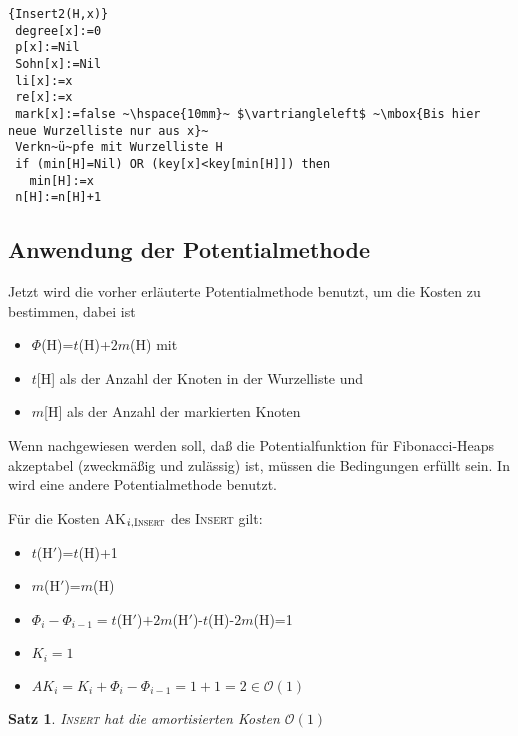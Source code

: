 \documentclass[ngerman,draft,parskip=half*,twoside]{scrreprt}
\theoremstyle{break}
\newtheorem{satz}{Satz}[chapter]
\theoremstyle{nonumberbreak}
\newcommand*{\OO}{\mathcal{O}}      %
\begin{document}
\begin{Algorithmus}[H]
\begin{lstlisting}[frame=tlrb, mathescape=true, title=\textsc{Insert\textnormal{(H, x)}}, gobble=1]{Insert2(H,x)}
 degree[x]:=0
 p[x]:=Nil
 Sohn[x]:=Nil
 li[x]:=x
 re[x]:=x
 mark[x]:=false ~\hspace{10mm}~ $\vartriangleleft$ ~\mbox{Bis hier neue Wurzelliste nur aus x}~
 Verkn~ü~pfe mit Wurzelliste H
 if (min[H]=Nil) OR (key[x]<key[min[H]]) then
   min[H]:=x
 n[H]:=n[H]+1   
\end{lstlisting}
\end{Algorithmus}

\subsection{Anwendung der Potentialmethode}
Jetzt wird die vorher erläuterte Potentialmethode benutzt, um die Kosten zu bestimmen, dabei ist
\begin{itemize}
\item $\Phi$(H)=$t$(H)+$2m$(H) mit
\item $t$[H] als der Anzahl der Knoten in der Wurzelliste und
\item $m$[H] als der Anzahl der markierten Knoten
\end{itemize}
Wenn nachgewiesen werden soll, daß die Potentialfunktion für Fibonacci-Heaps akzeptabel (zweckmäßig und zulässig)
ist, müssen die Bedingungen erfüllt sein. In \cite{ottmann} wird eine andere Potentialmethode benutzt.

Für die Kosten AK$_{i, \textsc{Insert}}$ des \textsc{Insert} gilt:
\begin{itemize}
\item $t$(H$'$)=$t$(H)+1
\item $m$(H$'$)=$m$(H)
\item ${\Phi}_i-{\Phi}_{i-1}=t$(H$'$)$+2m$(H$'$)-$t$(H)-$2m$(H)=1
\item $K_i=1$
\item $AK_i =K_i +\Phi_i-\Phi_{i-1}=1+1=2 \in \OO(1)$
\end{itemize}

\begin{satz}
\textsc{Insert} hat die amortisierten Kosten $\OO(1)$
\end{satz}
\end{document}
